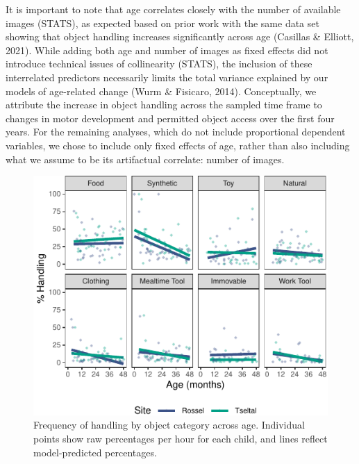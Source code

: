 \documentclass[10pt, letterpaper]{article}
\newenvironment{CodeChunk}{}{}
\begin{document}
It is important to note that age correlates closely with the number of
available images (STATS), as expected based on prior work with the same
data set showing that object handling increases significantly across age
(Casillas \& Elliott, 2021). While adding both age and number of images
as fixed effects did not introduce technical issues of collinearity
(STATS), the inclusion of these interrelated predictors necessarily
limits the total variance explained by our models of age-related change
(Wurm \& Fisicaro, 2014). Conceptually, we attribute the increase in
object handling across the sampled time frame to changes in motor
development and permitted object access over the first four years. For
the remaining analyses, which do not include proportional dependent
variables, we chose to include only fixed effects of age, rather than
also including what we assume to be its artifactual correlate: number of
images.

\begin{CodeChunk}
\begin{figure}[!ht]

{\centering \includegraphics{figs/age-effects-bycategory-fig-1} 

}

\caption[Frequency of handling by object category across age]{Frequency of handling by object category across age. Individual points show raw percentages per hour for each child, and lines reflect model-predicted percentages.}\label{fig:age-effects-bycategory-fig}
\end{figure}
\end{CodeChunk}
\end{document}
